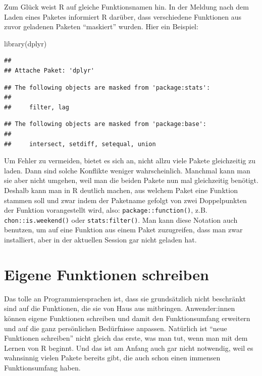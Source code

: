 \documentclass[
]{book}
\newenvironment{Shaded}{\begin{snugshade}}{\end{snugshade}}
\newcommand{\FunctionTok}[1]{\textcolor[rgb]{0.00,0.00,0.00}{#1}}
\newcommand{\NormalTok}[1]{#1}
\begin{document}
Zum Glück weist R auf gleiche Funktionsnamen hin. In der Meldung nach dem Laden eines Paketes informiert R darüber, dass verschiedene Funktionen aus zuvor geladenen Paketen ``maskiert'' wurden. Hier ein Beispiel:

\begin{Shaded}
\begin{Highlighting}[]
\FunctionTok{library}\NormalTok{(dplyr)}
\end{Highlighting}
\end{Shaded}

\begin{verbatim}
## 
## Attache Paket: 'dplyr'
\end{verbatim}

\begin{verbatim}
## The following objects are masked from 'package:stats':
## 
##     filter, lag
\end{verbatim}

\begin{verbatim}
## The following objects are masked from 'package:base':
## 
##     intersect, setdiff, setequal, union
\end{verbatim}

Um Fehler zu vermeiden, bietet es sich an, nicht allzu viele Pakete gleichzeitig zu laden. Dann sind solche Konflikte weniger wahrscheinlich. Manchmal kann man sie aber nicht umgehen, weil man die beiden Pakete nun mal gleichzeitig benötigt. Deshalb kann man in R deutlich machen, aus welchem Paket eine Funktion stammen soll und zwar indem der Paketname gefolgt von zwei Doppelpunkten der Funktion vorangestellt wird, also: \texttt{package::function()}, z.B. \texttt{chon::is.weekend()} oder \texttt{stats:filter()}. Man kann diese Notation auch benutzen, um auf eine Funktion aus einem Paket zuzugreifen, dass man zwar installiert, aber in der aktuellen Session gar nicht geladen hat.

\hypertarget{eigene-funktionen-schreiben}{%
\section{Eigene Funktionen schreiben}\label{eigene-funktionen-schreiben}}

Das tolle an Programmiersprachen ist, dass sie grundsätzlich nicht beschränkt sind auf die Funktionen, die sie von Haus aus mitbringen. Anwender:innen können eigene Funktionen schreiben und damit den Funktionsumfang erweitern und auf die ganz persönlichen Bedürfnisse anpassen. Natürlich ist ``neue Funktionen schreiben'' nicht gleich das erste, was man tut, wenn man mit dem Lernen von R beginnt. Und das ist am Anfang auch gar nicht notwendig, weil es wahnsinnig vielen Pakete bereits gibt, die auch schon einen immensen Funktionsumfang haben.
\end{document}
